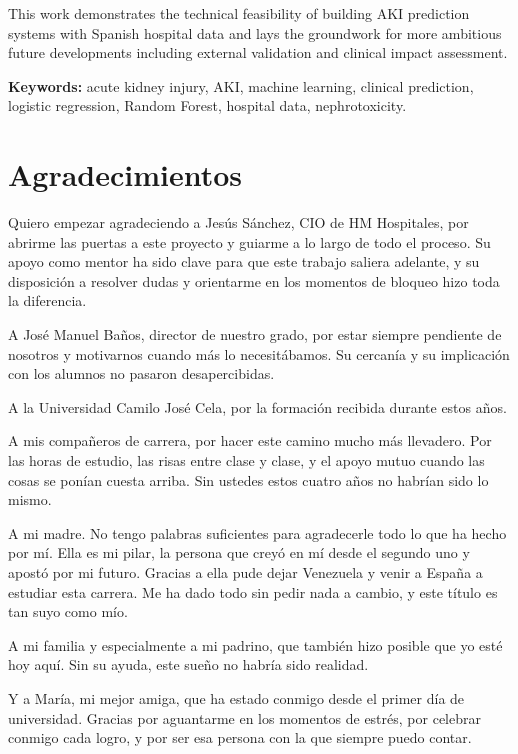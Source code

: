 \documentclass[12pt, a4paper, oneside]{report}
\begin{document}
This work demonstrates the technical feasibility of building AKI prediction systems with Spanish hospital data and lays the groundwork for more ambitious future developments including external validation and clinical impact assessment.

\vspace{1cm}
\textbf{Keywords:} acute kidney injury, AKI, machine learning, clinical prediction, logistic regression, Random Forest, hospital data, nephrotoxicity.

\chapter*{Agradecimientos}

Quiero empezar agradeciendo a Jesús Sánchez, CIO de HM Hospitales, por abrirme las puertas a este proyecto y guiarme a lo largo de todo el proceso. Su apoyo como mentor ha sido clave para que este trabajo saliera adelante, y su disposición a resolver dudas y orientarme en los momentos de bloqueo hizo toda la diferencia.

A José Manuel Baños, director de nuestro grado, por estar siempre pendiente de nosotros y motivarnos cuando más lo necesitábamos. Su cercanía y su implicación con los alumnos no pasaron desapercibidas.

A la Universidad Camilo José Cela, por la formación recibida durante estos años.

A mis compañeros de carrera, por hacer este camino mucho más llevadero. Por las horas de estudio, las risas entre clase y clase, y el apoyo mutuo cuando las cosas se ponían cuesta arriba. Sin ustedes estos cuatro años no habrían sido lo mismo.

A mi madre. No tengo palabras suficientes para agradecerle todo lo que ha hecho por mí. Ella es mi pilar, la persona que creyó en mí desde el segundo uno y apostó por mi futuro. Gracias a ella pude dejar Venezuela y venir a España a estudiar esta carrera. Me ha dado todo sin pedir nada a cambio, y este título es tan suyo como mío.

A mi familia y especialmente a mi padrino, que también hizo posible que yo esté hoy aquí. Sin su ayuda, este sueño no habría sido realidad.

Y a María, mi mejor amiga, que ha estado conmigo desde el primer día de universidad. Gracias por aguantarme en los momentos de estrés, por celebrar conmigo cada logro, y por ser esa persona con la que siempre puedo contar.
\end{document}

